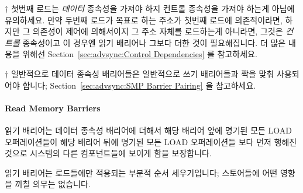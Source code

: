 \begin{enumerate}
$\dagger$ 첫번째 로드는 \emph{데이터} 종속성을 가져야 하지 컨트롤 종속성을
가져야 하는게 아님에 유의하세요.
만약 두번째 로드가 목표로 하는 주소가 첫번째 로드에 의존적이라면, 하지만 그
의존성이 제어에 의해서이지 그 주소 자체를 로드하는게 아니라면, 그것은
\emph{컨트롤} 종속성이고 이 경우엔 읽기 배리어나 그보다 더한 것이 필요해집니다.
더 많은 내용을 위해선 Section~\ref{sec:advsync:Control Dependencies} 를
참고하세요.

$\dagger$ 일반적으로 데이터 종속성 배리어들은 일반적으로 쓰기 배리어들과 짝을
맞춰 사용되어야 합니다; Section~\ref{sec:advsync:SMP Barrier Pairing} 을
참고하세요.

\paragraph{Read Memory Barriers}

읽기 배리어는 데이터 종속성 배리어에 더해서 해당 배리어 앞에 명기된 모든 LOAD
오퍼레이션들이 해당 배리어 뒤에 명기된 모든 LOAD 오퍼레이션들 보다 먼저 행해진
것으로 시스템의 다른 컴포넌트들에 보이게 함을 보장합니다.

읽기 배리어는 로드들에만 적용되는 부분적 순서 세우기입니다; 스토어들에 어떤
영향을 끼칠 의무는 없습니다.


\end{enumerate}
